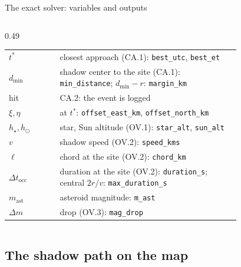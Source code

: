 \begin{frame}{The exact solver: variables and outputs}
\begin{columns}[T]
\begin{column}{0.49\textwidth}
      \begin{tabular}{@{}l >{\raggedright\arraybackslash}p{0.78\linewidth}@{}}
        $t^{*}$ & closest approach (CA.1): \texttt{best\_utc}, \texttt{best\_et} \\
        $d_{\min}$ & shadow center to the site (CA.1): \texttt{min\_distance}; $d_{\min} - r$: \texttt{margin\_km} \\
        hit & CA.2: the event is logged \\
        $\xi, \eta$ & at $t^{*}$: \texttt{offset\_east\_km}, \texttt{offset\_north\_km} \\
        $h_\star, h_\odot$ & star, Sun altitude (OV.1): \texttt{star\_alt}, \texttt{sun\_alt} \\
        $v$ & shadow speed (OV.2): \texttt{speed\_kms} \\
        $\ell$ & chord at the site (OV.2): \texttt{chord\_km} \\
        $\Delta t_{\mathrm{occ}}$ & duration at the site (OV.2): \texttt{duration\_s};
                                   central $2r/v$: \texttt{max\_duration\_s} \\
        $m_{\mathrm{ast}}$ & asteroid magnitude: \texttt{m\_ast} \\
        $\Delta m$ & drop (OV.3): \texttt{mag\_drop} \\
      \end{tabular}
    \end{column}
  \end{columns}
\end{frame}

\subsection{The shadow path on the map}

